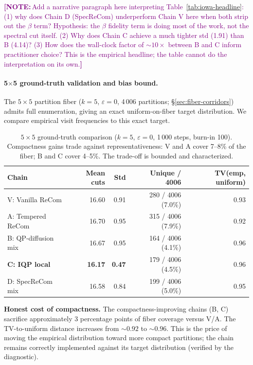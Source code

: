 \documentclass[11pt]{article}
\newcommand{\note}[1]{\textcolor{purple}{\textbf{[NOTE:}\,#1\textbf{]}}}
\begin{document}
\note{Add a narrative paragraph here interpreting
Table~\ref{tab:iowa-headline}:
(1) why does Chain D (SpecReCom) underperform Chain V here when both
strip out the $\beta$ term? Hypothesis: the $\beta$ fidelity term is
doing most of the work, not the spectral cut itself.
(2) Why does Chain C achieve a much tighter std (1.91) than B (4.14)?
(3) How does the wall-clock factor of $\sim 10\times$ between B and C
inform practitioner choice?
This is the empirical headline; the table cannot do the interpretation
on its own.}

\paragraph{5$\times$5 ground-truth validation and bias bound.}\label{sec:exp-5x5}

The $5 \times 5$ partition fiber ($k = 5$, $\varepsilon = 0$, 4\,006
partitions; \S\ref{sec:fiber-corridors}) admits full enumeration,
giving an exact uniform-on-fiber target distribution. We compare
empirical visit frequencies to this exact target.

\begin{table}[H]
\centering
\small
\begin{tabular}{lrrrr}
\toprule
Chain & Mean cuts & Std & Unique / 4006 & TV(emp, uniform) \\
\midrule
V: Vanilla ReCom     & 16.60 & 0.91 & 280 / 4006 (7.0\%) & 0.93 \\
A: Tempered ReCom    & 16.70 & 0.95 & 315 / 4006 (7.9\%) & 0.92 \\
B: QP-diffusion mix  & 16.67 & 0.95 & 164 / 4006 (4.1\%) & 0.96 \\
\textbf{C: IQP local}        & \textbf{16.17} & \textbf{0.47}
                              & 179 / 4006 (4.5\%) & 0.96 \\
D: SpecReCom mix     & 16.58 & 0.84 & 199 / 4006 (5.0\%) & 0.95 \\
\bottomrule
\end{tabular}
\caption{$5 \times 5$ ground-truth comparison ($k = 5$,
  $\varepsilon = 0$, 1\,000 steps, burn-in 100). Compactness gains
  trade against representativeness: V and A cover 7--8\% of the
  fiber; B and C cover 4--5\%. The trade-off is bounded and
  characterized.}\label{tab:5x5-headline}
\end{table}

\textbf{Honest cost of compactness.} The compactness-improving chains
(B, C) sacrifice approximately 3 percentage points of fiber coverage
versus V/A. The TV-to-uniform distance increases from $\sim 0.92$ to
$\sim 0.96$. This is the price of moving the empirical distribution
toward more compact partitions; the chain remains correctly
implemented against its target distribution (verified by the
diagnostic).
\end{document}
